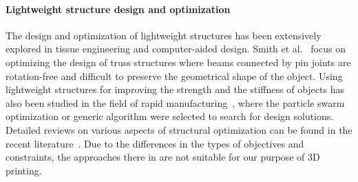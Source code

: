 \paragraph{Lightweight structure design and optimization}
The design and optimization of lightweight structures has been extensively explored in tissue engineering and computer-aided design. 
%
Smith et al.~ focus on optimizing the design of truss structures where beams connected by pin joints are rotation-free and difficult to preserve the geometrical shape of the object.
%
Using lightweight structures for improving the strength and the stiffness of objects has also been studied in the field of rapid manufacturing~\cite{wang:2005}, where the particle swarm optimization or generic algorithm were selected to search for design solutions. Detailed reviews on various aspects of structural optimization can be found in the recent literature~\cite{bendsoe:2003}. Due to the differences in the types of objectives and constraints, the approaches there in are not suitable for our purpose of 3D printing.



